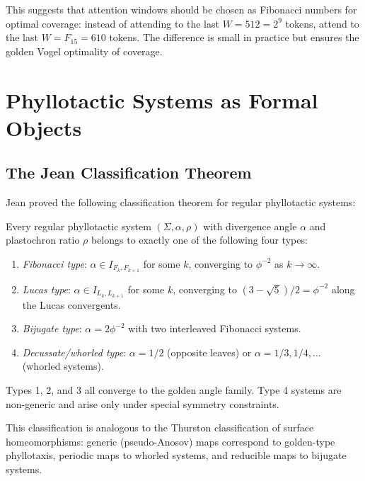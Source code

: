 This suggests that attention windows should be chosen as Fibonacci
numbers for optimal coverage: instead of attending to the last $W =
512 = 2^9$ tokens, attend to the last $W = F_{15} = 610$ tokens.
The difference is small in practice but ensures the golden Vogel
optimality of coverage.

\section{Phyllotactic Systems as Formal Objects}
\label{sec:formal-phyllo}

\subsection{The Jean Classification Theorem}
\label{subsec:jean-theorem}

Jean \cite{jean1994phyllotaxis} proved the following classification
theorem for regular phyllotactic systems:

\begin{theorem}\label{thm:jean-class}
Every regular phyllotactic system $(\Sigma, \alpha, \rho)$ with
divergence angle $\alpha$ and plastochron ratio $\rho$ belongs to
exactly one of the following four types:
\begin{enumerate}
  \item \emph{Fibonacci type}: $\alpha \in I_{F_k, F_{k+1}}$ for some
        $k$, converging to $\phi^{-2}$ as $k \to \infty$.
  \item \emph{Lucas type}: $\alpha \in I_{L_k, L_{k+1}}$ for some $k$,
        converging to $(3-\sqrt{5})/2 = \phi^{-2}$ along the Lucas
        convergents.
  \item \emph{Bijugate type}: $\alpha = 2\phi^{-2}$ with two
        interleaved Fibonacci systems.
  \item \emph{Decussate/whorled type}: $\alpha = 1/2$ (opposite leaves)
        or $\alpha = 1/3, 1/4, \ldots$ (whorled systems).
\end{enumerate}
Types 1, 2, and 3 all converge to the golden angle family.  Type 4
systems are non-generic and arise only under special symmetry
constraints.
\end{theorem}

This classification is analogous to the Thurston classification of
surface homeomorphisms: generic (pseudo-Anosov) maps correspond to
golden-type phyllotaxis, periodic maps to whorled systems, and
reducible maps to bijugate systems.

